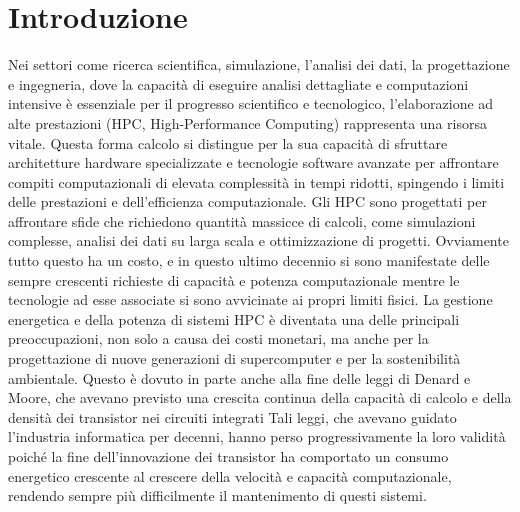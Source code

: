 \chapter{Introduzione}

Nei settori come ricerca scientifica, simulazione, l'analisi dei dati, la progettazione e ingegneria, dove la capacità di eseguire analisi dettagliate e computazioni intensive è essenziale per il progresso scientifico e tecnologico, l'elaborazione ad alte prestazioni (HPC, High-Performance Computing) rappresenta una risorsa vitale. Questa forma calcolo si distingue per la sua capacità di sfruttare architetture hardware specializzate e tecnologie software avanzate per affrontare compiti computazionali di elevata complessità in tempi ridotti, spingendo i limiti delle prestazioni e dell'efficienza computazionale.%
Gli HPC sono progettati per affrontare sfide che richiedono quantità massicce di calcoli, come simulazioni complesse, analisi dei dati su larga scala e ottimizzazione di progetti. Ovviamente tutto questo ha un costo, e in questo ultimo decennio si sono manifestate delle sempre crescenti richieste di capacità e potenza computazionale mentre le tecnologie ad esse associate si sono avvicinate ai propri limiti fisici. %
La gestione energetica e della potenza di sistemi HPC è diventata una delle principali preoccupazioni, non solo a causa dei costi monetari, ma anche per la progettazione di nuove generazioni %
di supercomputer e per la sostenibilità ambientale. 
Questo è dovuto in parte anche alla fine delle leggi di Denard e Moore, che avevano previsto una crescita continua della capacità di calcolo e della densità dei transistor nei circuiti integrati %
Tali leggi, che avevano guidato l'industria informatica per decenni, hanno perso progressivamente la loro validità poiché la fine dell'innovazione dei transistor %
ha comportato un consumo energetico crescente al crescere della velocità e capacità computazionale, rendendo sempre più difficilmente il mantenimento di questi sistemi. %
